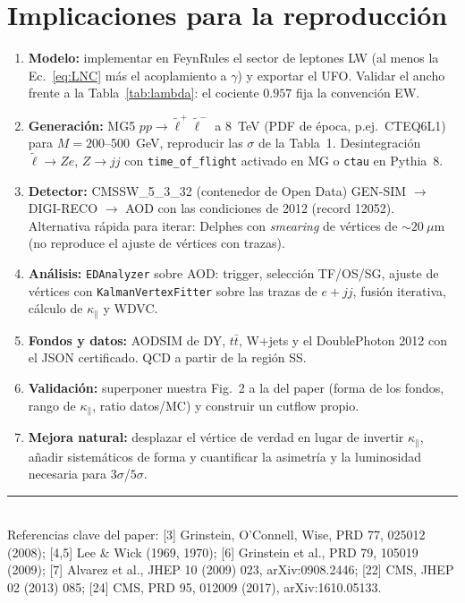 \documentclass[11pt,a4paper]{article}
\newcommand{\lt}{\tilde{\ell}}
\newcommand{\kpar}{\kappa_{\parallel}}
\begin{document}
\section{Implicaciones para la reproducción}
\begin{enumerate}
\item \textbf{Modelo:} implementar en FeynRules el sector de leptones LW (al menos la Ec.~\eqref{eq:LNC} más el acoplamiento a $\gamma$) y exportar el UFO. Validar el ancho frente a la Tabla~\ref{tab:lambda}: el cociente $0.957$ fija la convención EW.
\item \textbf{Generación:} MG5 $pp\to\lt^+\lt^-$ a 8~TeV (PDF de época, p.ej.\ CTEQ6L1) para $M=200$--500~GeV, reproducir las $\sigma$ de la Tabla~1. Desintegración $\lt\to Ze$, $Z\to jj$ con \texttt{time\_of\_flight} activado en MG o \texttt{ctau} en Pythia~8.
\item \textbf{Detector:} CMSSW\_5\_3\_32 (contenedor de Open Data) GEN-SIM $\to$ DIGI-RECO $\to$ AOD con las condiciones de 2012 (record 12052). Alternativa rápida para iterar: Delphes con \emph{smearing} de vértices de $\sim20~\mu$m (no reproduce el ajuste de vértices con trazas).
\item \textbf{Análisis:} \texttt{EDAnalyzer} sobre AOD: trigger, selección TF/OS/SG, ajuste de vértices con \texttt{KalmanVertexFitter} sobre las trazas de $e+jj$, fusión iterativa, cálculo de $\kpar$ y WDVC.
\item \textbf{Fondos y datos:} AODSIM de DY, $t\bar t$, W+jets y el DoublePhoton 2012 con el JSON certificado. QCD a partir de la región SS.
\item \textbf{Validación:} superponer nuestra Fig.~2 a la del paper (forma de los fondos, rango de $\kpar$, ratio datos/MC) y construir un cutflow propio.
\item \textbf{Mejora natural:} desplazar el vértice de verdad en lugar de invertir $\kpar$, añadir sistemáticos de forma y cuantificar la asimetría y la luminosidad necesaria para $3\sigma$/$5\sigma$.
\end{enumerate}

\vfill
\noindent\rule{\linewidth}{0.4pt}\\
\small Referencias clave del paper: [3] Grinstein, O'Connell, Wise, PRD 77, 025012 (2008); [4,5] Lee \& Wick (1969, 1970); [6] Grinstein et al., PRD 79, 105019 (2009); [7] Alvarez et al., JHEP 10 (2009) 023, arXiv:0908.2446; [22] CMS, JHEP 02 (2013) 085; [24] CMS, PRD 95, 012009 (2017), arXiv:1610.05133.
\end{document}
